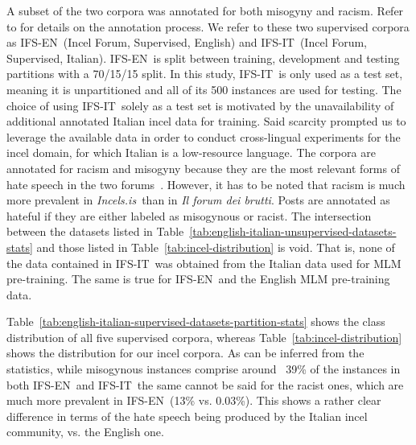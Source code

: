 \documentclass[11pt]{article}
\newcommand{\paolo}[1]{{\color{red} #1}}
\newcommand{\todoA}[1]{\todo[color=blue!40]{A: #1}}
\newcommand{\dsENclassification}{IFS-EN}
\newcommand{\dsITclassification}{IFS-IT}
\newcommand{\enforum}{\textit{Incels.is}}
\newcommand{\itforum}{\textit{Il forum dei brutti}}
\begin{document}
A subset of the two corpora was annotated for both misogyny and racism. \paolo{Refer to  for details on the annotation process.}
We refer to these two supervised corpora as \dsENclassification\, (Incel Forum, Supervised, English) and \dsITclassification\, (Incel Forum, Supervised, Italian). \dsENclassification~is split between training, development and testing partitions with a 70/15/15 split. In this study, \dsITclassification~is only used as a test set, meaning it is unpartitioned and all of its 500 instances are used for testing. \paolo{The choice of using \dsITclassification\, solely as a test set is motivated by the unavailability of additional annotated Italian incel data for training. Said scarcity prompted us to leverage the available data in order to conduct cross-lingual experiments for the incel domain, for which Italian is a low-resource language.}
The corpora are annotated for racism and misogyny because they are the most relevant forms of hate speech in the two forums~\cite{silva2016analyzing,ging2018special}. However, it has to be noted that racism is much more prevalent in \enforum\, than in \itforum. Posts are annotated as hateful if they are either labeled as misogynous or racist.
The intersection between \paolo{the datasets listed in Table~\ref{tab:english-italian-unsupervised-datasets-stats} and those listed in Table~\ref{tab:incel-distribution} is void. That is, none of the data contained in \dsITclassification\, was obtained from the Italian data used for MLM pre-training. The same is true for \dsENclassification\, and the English MLM pre-training data.}

Table~\ref{tab:english-italian-supervised-datasets-partition-stats} shows the class distribution of all five supervised corpora, whereas Table~\ref{tab:incel-distribution} shows the distribution for our incel corpora. \paolo{As can be inferred from the statistics, while misogynous instances comprise around ~39\% of the instances in both \dsENclassification\, and \dsITclassification\, the same cannot be said for the racist ones, which are much more prevalent in \dsENclassification\, (13\% vs. 0.03\%). This shows a rather clear difference in terms of the hate speech being produced by the Italian incel community, vs. the English one.}
\end{document}
